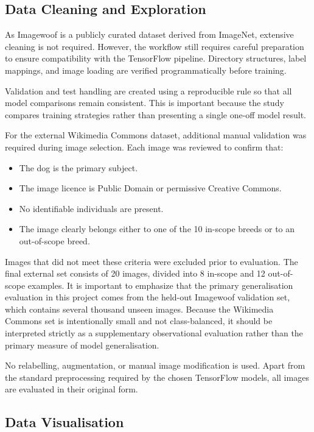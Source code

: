 \documentclass[12pt, a4paper]{article}
\begin{document}
\subsection{Data Cleaning and Exploration}

As Imagewoof is a publicly curated dataset derived from ImageNet, extensive cleaning is not required. However, the workflow still requires careful preparation to ensure compatibility with the TensorFlow pipeline. Directory structures, label mappings, and image loading are verified programmatically before training.

Validation and test handling are created using a reproducible rule so that all model comparisons remain consistent. This is important because the study compares training strategies rather than presenting a single one-off model result.

For the external Wikimedia Commons dataset, additional manual validation was required during image selection. Each image was reviewed to confirm that:

\begin{itemize}
  \item The dog is the primary subject.
  \item The image licence is Public Domain or permissive Creative Commons.
  \item No identifiable individuals are present.
  \item The image clearly belongs either to one of the 10 in-scope breeds or to an out-of-scope breed.
\end{itemize}

Images that did not meet these criteria were excluded prior to evaluation. The final external set consists of 20 images, divided into 8 in-scope and 12 out-of-scope examples. It is important to emphasize that the primary generalisation evaluation in this project comes from the held-out Imagewoof validation set, which contains several thousand unseen images. Because the Wikimedia Commons set is intentionally small and not class-balanced, it should be interpreted strictly as a supplementary observational evaluation rather than the primary measure of model generalisation.

No relabelling, augmentation, or manual image modification is used. Apart from the standard preprocessing required by the chosen TensorFlow models, all images are evaluated in their original form.

\subsection{Data Visualisation}
\end{document}
